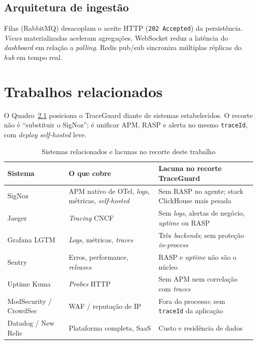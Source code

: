 \documentclass[
  12pt,
  oneside,
  a4paper,
  english,
  brazil,
  sumario=tradicional
]{abntex2}
\begin{document}
\section{Arquitetura de ingestão}

Filas (RabbitMQ) desacoplam o aceite HTTP (\texttt{202 Accepted}) da persistência. \textit{Views} materializadas aceleram agregações. WebSocket reduz a latência do \textit{dashboard} em relação a \textit{polling}. Redis pub/sub sincroniza múltiplas réplicas do \textit{hub} em tempo real.

\chapter{Trabalhos relacionados}

O Quadro~\ref{tab:relacionados} posiciona o TraceGuard diante de sistemas estabelecidos. O recorte não é ``substituir o SigNoz''; é unificar APM, RASP e alerta no mesmo \texttt{traceId}, com \textit{deploy} \textit{self-hosted} leve.

\begin{table}[htbp]
\caption{Sistemas relacionados e lacunas no recorte deste trabalho}
\label{tab:relacionados}
\centering
\small
\begin{tabular}{@{}p{3.4cm}p{5.2cm}p{5.6cm}@{}}
\toprule
\textbf{Sistema} & \textbf{O que cobre} & \textbf{Lacuna no recorte TraceGuard} \\
\midrule
SigNoz & APM nativo de OTel, \textit{logs}, métricas, \textit{self-hosted} & Sem RASP no agente; stack ClickHouse mais pesada \\
Jaeger & \textit{Tracing} CNCF & Sem \textit{logs}, alertas de negócio, \textit{uptime} ou RASP \\
Grafana LGTM & \textit{Logs}, métricas, \textit{traces} & Três \textit{backends}; sem proteção \textit{in-process} \\
Sentry & Erros, performance, \textit{releases} & RASP e \textit{uptime} não são o núcleo \\
Uptime Kuma & \textit{Probes} HTTP & Sem APM nem correlação com \textit{traces} \\
ModSecurity / CrowdSec & WAF / reputação de IP & Fora do processo; sem \texttt{traceId} da aplicação \\
Datadog / New Relic & Plataforma completa, SaaS & Custo e residência de dados \\
\bottomrule
\end{tabular}
\end{table}
\end{document}
